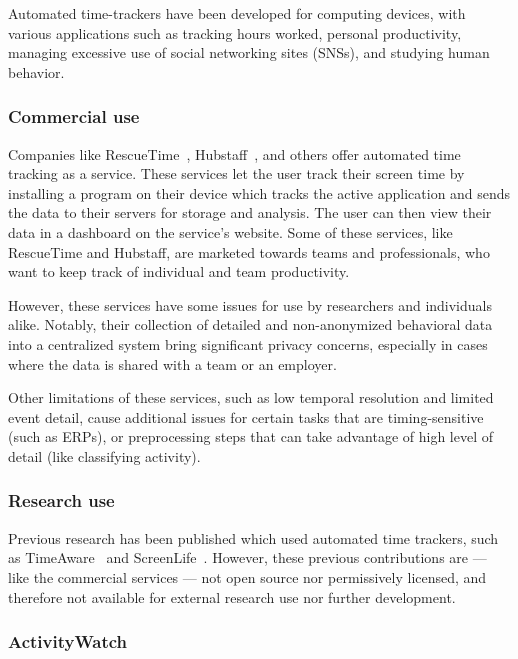     Automated time-trackers have been developed for computing devices, with various applications such as tracking hours worked, personal productivity, managing excessive use of social networking sites (SNSs), and studying human behavior.

    \subsubsection{Commercial use}

        Companies like RescueTime~\cite{noauthor_rescuetime_nodate}, Hubstaff~\cite{noauthor_hubstaff_nodate}, and others offer automated time tracking as a service. These services let the user track their screen time by installing a program on their device which tracks the active application and sends the data to their servers for storage and analysis. The user can then view their data in a dashboard on the service's website. Some of these services, like RescueTime and Hubstaff, are marketed towards teams and professionals, who want to keep track of individual and team productivity.

        However, these services have some issues for use by researchers and individuals alike. Notably, their collection of detailed and non-anonymized behavioral data into a centralized system bring significant privacy concerns, especially in cases where the data is shared with a team or an employer.

        Other limitations of these services, such as low temporal resolution and limited event detail, cause additional issues for certain tasks that are timing-sensitive (such as ERPs), or preprocessing steps that can take advantage of high level of detail (like classifying activity).

    \subsubsection{Research use}

        Previous research has been published which used automated time trackers, such as TimeAware~\cite{kim_timeaware_2016} and ScreenLife~\cite{rooksby_personal_2016}. However, these previous contributions are --- like the commercial services --- not open source nor permissively licensed, and therefore not available for external research use nor further development.

    \subsubsection{ActivityWatch}

